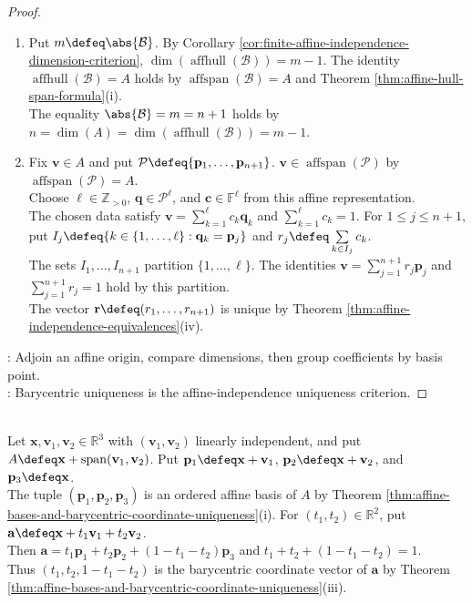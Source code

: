 \begin{theorem}
\begin{proof}
\begin{enumerate}[label=(\roman*)]
\item Put $m\defeq\abs{\mathcal{B}}$. By Corollary \ref{cor:finite-affine-independence-dimension-criterion}, $\dim(\operatorname{affhull}(\mathcal{B}))=m-1$. The identity $\operatorname{affhull}(\mathcal{B})=A$ holds by $\operatorname{affspan}(\mathcal{B})=A$ and Theorem \ref{thm:affine-hull-span-formula}(i).\\
The equality $\abs{\mathcal{B}}=m=n+1$ holds by $n=\dim(A)=\dim(\operatorname{affhull}(\mathcal{B}))=m-1$.
\item Fix $\mathbf{v}\in A$ and put $\mathcal{P}\defeq\{\mathbf{p}_1,\ldots,\mathbf{p}_{n+1}\}$. $\mathbf{v}\in\operatorname{affspan}(\mathcal{P})$ by $\operatorname{affspan}(\mathcal{P})=A$.\\
Choose $\ell\in\mathbb{Z}_{>0}$, $\mathbf{q}\in\mathcal{P}^{\ell}$, and $\mathbf{c}\in\mathbb{F}^{\ell}$ from this affine representation.\\
The chosen data satisfy $\mathbf{v}=\sum\limits_{k=1}^{\ell}c_k\mathbf{q}_k$ and $\sum\limits_{k=1}^{\ell}c_k=1$. For $1\leq j\leq n+1$, put $I_j\defeq\{k\in\{1,\ldots,\ell\}:\mathbf{q}_k=\mathbf{p}_j\}$ and $r_j\defeq\sum\limits_{k\in I_j}c_k$.\\
The sets $I_1,\ldots,I_{n+1}$ partition $\{1,\ldots,\ell\}$. The identities $\mathbf{v}=\sum\limits_{j=1}^{n+1}r_j\mathbf{p}_j$ and $\sum\limits_{j=1}^{n+1}r_j=1$ hold by this partition.\\
The vector $\mathbf{r}\defeq(r_1,\ldots,r_{n+1})$ is unique by Theorem \ref{thm:affine-independence-equivalences}(iv).
\end{enumerate}
: Adjoin an affine origin, compare dimensions, then group coefficients by basis point.\\
: Barycentric uniqueness is the affine-independence uniqueness criterion.
\end{proof}
\end{theorem}

\begin{example} \label{ex:barycentric-coordinates-on-plane} \\
Let $\mathbf{x},\mathbf{v}_1,\mathbf{v}_2\in\mathbb{R}^3$ with $(\mathbf{v}_1,\mathbf{v}_2)$ linearly independent, and put $A\defeq\mathbf{x}+\operatorname{span}(\mathbf{v}_1,\mathbf{v}_2)$. Put $\mathbf{p}_1\defeq\mathbf{x}+\mathbf{v}_1$, $\mathbf{p}_2\defeq\mathbf{x}+\mathbf{v}_2$, and $\mathbf{p}_3\defeq\mathbf{x}$.\\
The tuple $(\mathbf{p}_1,\mathbf{p}_2,\mathbf{p}_3)$ is an ordered affine basis of $A$ by Theorem \ref{thm:affine-bases-and-barycentric-coordinate-uniqueness}(i). For $(t_1,t_2)\in\mathbb{R}^2$, put $\mathbf{a}\defeq\mathbf{x}+t_1\mathbf{v}_1+t_2\mathbf{v}_2$.\\
Then $\mathbf{a}=t_1\mathbf{p}_1+t_2\mathbf{p}_2+(1-t_1-t_2)\mathbf{p}_3$ and $t_1+t_2+(1-t_1-t_2)=1$.\\
Thus $(t_1,t_2,1-t_1-t_2)$ is the barycentric coordinate vector of $\mathbf{a}$ by Theorem \ref{thm:affine-bases-and-barycentric-coordinate-uniqueness}(iii).
\end{example}
